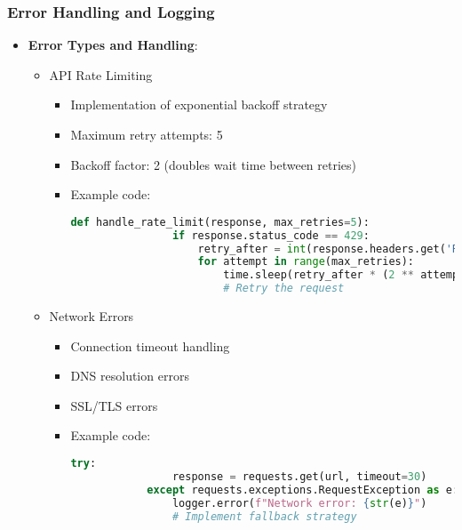\documentclass[12pt]{article}
\begin{document}
\subsubsection{Error Handling and Logging}
\begin{itemize}
    \item \textbf{Error Types and Handling}:
    \begin{itemize}
        \item API Rate Limiting
        \begin{itemize}
            \item Implementation of exponential backoff strategy
            \item Maximum retry attempts: 5
            \item Backoff factor: 2 (doubles wait time between retries)
            \item Example code:
            \begin{lstlisting}[language=Python]
            def handle_rate_limit(response, max_retries=5):
                if response.status_code == 429:
                    retry_after = int(response.headers.get('Retry-After', 60))
                    for attempt in range(max_retries):
                        time.sleep(retry_after * (2 ** attempt))
                        # Retry the request
            \end{lstlisting}
        \end{itemize}
        
        \item Network Errors
        \begin{itemize}
            \item Connection timeout handling
            \item DNS resolution errors
            \item SSL/TLS errors
            \item Example code:
            \begin{lstlisting}[language=Python]
            try:
                response = requests.get(url, timeout=30)
            except requests.exceptions.RequestException as e:
                logger.error(f"Network error: {str(e)}")
                # Implement fallback strategy
            \end{lstlisting}
        \end{itemize}
        

\end{itemize}
\end{itemize}
\end{document}
